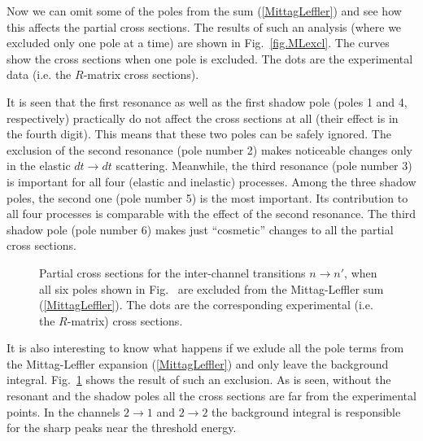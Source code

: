 \documentclass[12pt]{article}
\begin{document}
Now we can omit some of the poles from the sum (\ref{MittagLeffler})
and see how this affects the partial cross sections. The results of such an
analysis (where we excluded only one pole at a time) are shown in
Fig.~\ref{fig.MLexcl}. The curves show the cross sections when one pole is
excluded. The dots are the experimental data (i.e. the $R$-matrix cross
sections).

It is seen that the first resonance as well as the first
shadow pole (poles 1 and 4, respectively) practically do not affect the cross
sections at all (their effect is in the fourth digit). This means that these two
poles can be safely ignored. The exclusion of the second resonance (pole number
2) makes noticeable changes only in the elastic $dt\to dt$ scattering.
Meanwhile, the third resonance (pole number 3) is important for all four
(elastic and inelastic) processes. Among the three shadow poles, the second one
(pole number 5) is the most important. Its contribution to all four processes
is comparable with the effect of the second resonance. The third shadow pole
(pole number 6) makes just ``cosmetic'' changes to all the partial cross
sections.

\begin{figure}
\centerline{}
\caption{\sf
Partial cross sections for the inter-channel transitions $n\to n'$, when all
six poles shown in Fig.~\protect{\ref{fig.6poles}} are excluded from the
Mittag-Leffler sum (\ref{MittagLeffler}). The dots are the corresponding
experimental (i.e. the $R$-matrix) cross sections.
}
\label{fig.Nopoles}
\end{figure}

It is also interesting to know what happens if we exlude all the pole terms
from the Mittag-Leffler expansion (\ref{MittagLeffler}) and only leave the
background integral. Fig.~\ref{fig.Nopoles} shows the result of such an
exclusion. As is seen, without the resonant and the shadow poles all the cross
sections are far from the experimental points. In the channels $2\to1$ and
$2\to2$ the background integral is responsible for the sharp peaks near the
threshold energy.

\end{document}
